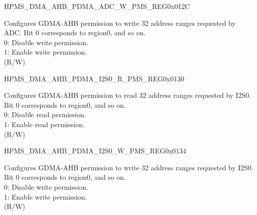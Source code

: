 \begin{register}{H}{PMS\_DMA\_AHB\_PDMA\_ADC\_W\_PMS\_REG}{0x012C}\label{regdesc:PMSDMAAHBPDMAADCWPMSREG}
%
\regnewline%
\begin{regdesc}\begin{reglist}
\label{fielddesc:PMSDMAAHBPDMAADCWPMS}\item [PMS\_DMA\_AHB\_PDMA\_ADC\_W\_PMS] Configures GDMA-AHB permission to write 32 address ranges requested by ADC. Bit 0 corresponds to region0, and so on.\\
0: Disable write permission.\\
1: Enable write permission.\\ (R/W)
\end{reglist}\end{regdesc}
\end{register}


\begin{register}{H}{PMS\_DMA\_AHB\_PDMA\_I2S0\_R\_PMS\_REG}{0x0130}\label{regdesc:PMSDMAAHBPDMAI2S0RPMSREG}
%
\regnewline%
\begin{regdesc}\begin{reglist}
\label{fielddesc:PMSDMAAHBPDMAI2S0RPMS}\item [PMS\_DMA\_AHB\_PDMA\_I2S0\_R\_PMS] Configures GDMA-AHB permission to read 32 address ranges requested by I2S0. Bit 0 corresponds to region0, and so on.\\
0: Disable read permission.\\
1: Enable read permission.\\ (R/W)
\end{reglist}\end{regdesc}
\end{register}


\begin{register}{H}{PMS\_DMA\_AHB\_PDMA\_I2S0\_W\_PMS\_REG}{0x0134}\label{regdesc:PMSDMAAHBPDMAI2S0WPMSREG}
%
\regnewline%
\begin{regdesc}\begin{reglist}
\label{fielddesc:PMSDMAAHBPDMAI2S0WPMS}\item [PMS\_DMA\_AHB\_PDMA\_I2S0\_W\_PMS] Configures GDMA-AHB permission to write 32 address ranges requested by I2S0. Bit 0 corresponds to region0, and so on.\\
0: Disable write permission.\\
1: Enable write permission.\\ (R/W)
\end{reglist}\end{regdesc}
\end{register}


